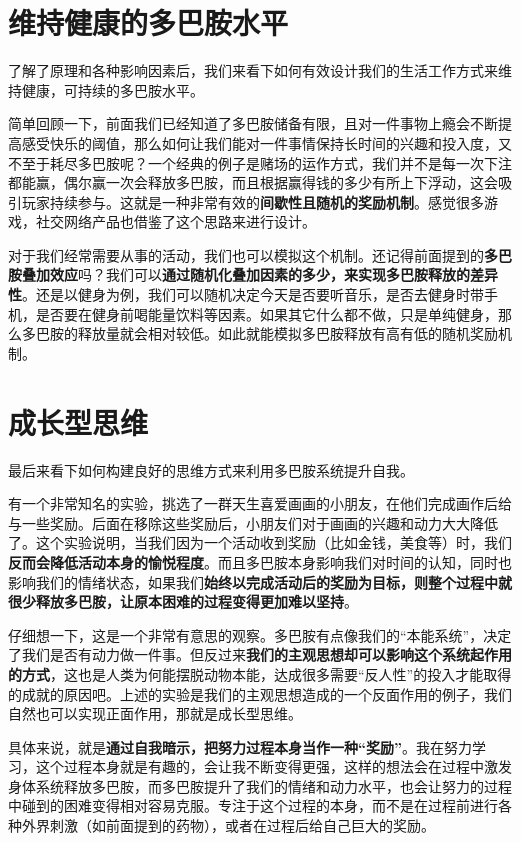 \documentclass{report}
\begin{document}
\section{维持健康的多巴胺水平}

了解了原理和各种影响因素后，我们来看下如何有效设计我们的生活工作方式来维持健康，可持续的多巴胺水平。

简单回顾一下，前面我们已经知道了多巴胺储备有限，且对一件事物上瘾会不断提高感受快乐的阈值，那么如何让我们能对一件事情保持长时间的兴趣和投入度，又不至于耗尽多巴胺呢？一个经典的例子是赌场的运作方式，我们并不是每一次下注都能赢，偶尔赢一次会释放多巴胺，而且根据赢得钱的多少有所上下浮动，这会吸引玩家持续参与。这就是一种非常有效的\textbf{间歇性且随机的奖励机制}。感觉很多游戏，社交网络产品也借鉴了这个思路来进行设计。

对于我们经常需要从事的活动，我们也可以模拟这个机制。还记得前面提到的\textbf{多巴胺叠加效应}吗？我们可以\textbf{通过随机化叠加因素的多少，来实现多巴胺释放的差异性}。还是以健身为例，我们可以随机决定今天是否要听音乐，是否去健身时带手机，是否要在健身前喝能量饮料等因素。如果其它什么都不做，只是单纯健身，那么多巴胺的释放量就会相对较低。如此就能模拟多巴胺释放有高有低的随机奖励机制。

\section{成长型思维}

最后来看下如何构建良好的思维方式来利用多巴胺系统提升自我。

有一个非常知名的实验，挑选了一群天生喜爱画画的小朋友，在他们完成画作后给与一些奖励。后面在移除这些奖励后，小朋友们对于画画的兴趣和动力大大降低了。这个实验说明，当我们因为一个活动收到奖励（比如金钱，美食等）时，我们\textbf{反而会降低活动本身的愉悦程度}。而且多巴胺本身影响我们对时间的认知，同时也影响我们的情绪状态，如果我们\textbf{始终以完成活动后的奖励为目标，则整个过程中就很少释放多巴胺，让原本困难的过程变得更加难以坚持}。

仔细想一下，这是一个非常有意思的观察。多巴胺有点像我们的“本能系统”，决定了我们是否有动力做一件事。但反过来\textbf{我们的主观思想却可以影响这个系统起作用的方式}，这也是人类为何能摆脱动物本能，达成很多需要“反人性”的投入才能取得的成就的原因吧。上述的实验是我们的主观思想造成的一个反面作用的例子，我们自然也可以实现正面作用，那就是成长型思维。

具体来说，就是\textbf{通过自我暗示，把努力过程本身当作一种“奖励”}。我在努力学习，这个过程本身就是有趣的，会让我不断变得更强，这样的想法会在过程中激发身体系统释放多巴胺，而多巴胺提升了我们的情绪和动力水平，也会让努力的过程中碰到的困难变得相对容易克服。专注于这个过程的本身，而不是在过程前进行各种外界刺激（如前面提到的药物），或者在过程后给自己巨大的奖励。
\end{document}
